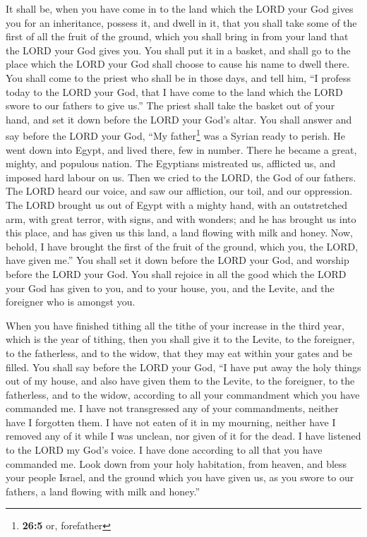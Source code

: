  It shall be, when you have come in to the land which the
LORD your God gives you for an inheritance, possess it, and dwell in it,
 that you shall take some of the first of all the fruit of
the ground, which you shall bring in from your land that the LORD your
God gives you. You shall put it in a basket, and shall go to the place
which the LORD your God shall choose to cause his name to dwell there.
 You shall come to the priest who shall be in those days,
and tell him, ``I profess today to the LORD your God, that I have come
to the land which the LORD swore to our fathers to give us.''
 The priest shall take the basket out of your hand, and
set it down before the LORD your God's altar.  You shall
answer and say before the LORD your God, ``My father\footnote{\textbf{26:5}
  or, forefather} was a Syrian ready to perish. He went down into Egypt,
and lived there, few in number. There he became a great, mighty, and
populous nation.  The Egyptians mistreated us, afflicted
us, and imposed hard labour on us.  Then we cried to the
LORD, the God of our fathers. The LORD heard our voice, and saw our
affliction, our toil, and our oppression.  The LORD
brought us out of Egypt with a mighty hand, with an outstretched arm,
with great terror, with signs, and with wonders;  and he
has brought us into this place, and has given us this land, a land
flowing with milk and honey.  Now, behold, I have brought
the first of the fruit of the ground, which you, the LORD, have given
me.'' You shall set it down before the LORD your God, and worship before
the LORD your God.  You shall rejoice in all the good
which the LORD your God has given to you, and to your house, you, and
the Levite, and the foreigner who is amongst you.

 When you have finished tithing all the tithe of your
increase in the third year, which is the year of tithing, then you shall
give it to the Levite, to the foreigner, to the fatherless, and to the
widow, that they may eat within your gates and be filled.
 You shall say before the LORD your God, ``I have put
away the holy things out of my house, and also have given them to the
Levite, to the foreigner, to the fatherless, and to the widow, according
to all your commandment which you have commanded me. I have not
transgressed any of your commandments, neither have I forgotten them.
 I have not eaten of it in my mourning, neither have I
removed any of it while I was unclean, nor given of it for the dead. I
have listened to the LORD my God's voice. I have done according to all
that you have commanded me.  Look down from your holy
habitation, from heaven, and bless your people Israel, and the ground
which you have given us, as you swore to our fathers, a land flowing
with milk and honey.''

